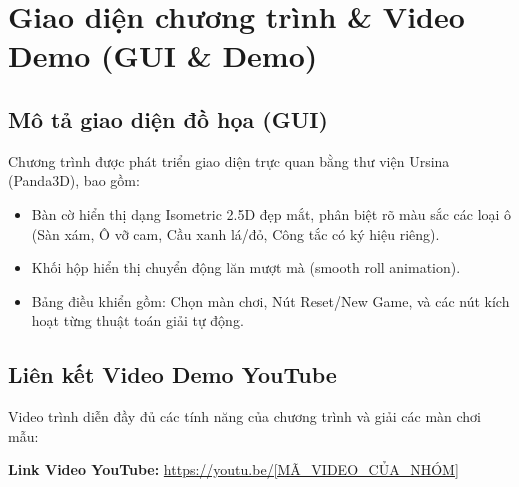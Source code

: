 \chapter{Giao diện chương trình \& Video Demo (GUI \& Demo)}

\newpage

\section{Mô tả giao diện đồ họa (GUI)}
Chương trình được phát triển giao diện trực quan bằng thư viện Ursina (Panda3D), bao gồm:
\begin{itemize}
    \item Bàn cờ hiển thị dạng Isometric 2.5D đẹp mắt, phân biệt rõ màu sắc các loại ô (Sàn xám, Ô vỡ cam, Cầu xanh lá/đỏ, Công tắc có ký hiệu riêng).
    \item Khối hộp hiển thị chuyển động lăn mượt mà (smooth roll animation).
    \item Bảng điều khiển gồm: Chọn màn chơi, Nút Reset/New Game, và các nút kích hoạt từng thuật toán giải tự động.
\end{itemize}

\section{Liên kết Video Demo YouTube}
Video trình diễn đầy đủ các tính năng của chương trình và giải các màn chơi mẫu:
\begin{center}
    \large
    \textbf{Link Video YouTube:} \url{https://youtu.be/[MÃ_VIDEO_CỦA_NHÓM]}
\end{center}
